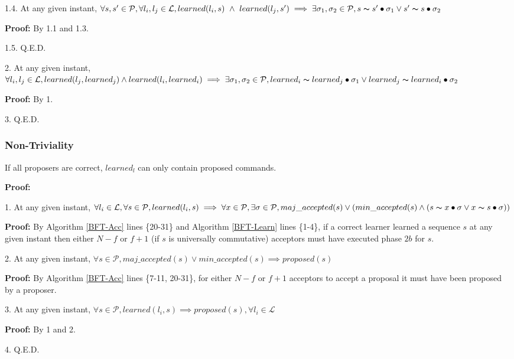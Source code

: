 \indent\indent\indent\parbox{\linewidth-\algorithmicindent*3}{\strut1.4. At any given instant, $\forall s,s' \in \mathcal{P}, \forall l_i,l_j \in \mathcal{L}, learned(l_i,s)\ \land\ learned(l_j,s') \implies \exists \sigma_1,\sigma_2 \in \mathcal{P}, s \thicksim s' \bullet \sigma_1 \lor s' \thicksim s \bullet \sigma_2$ }\par
\indent\indent\indent\indent\parbox{\linewidth}{\strut\textbf{Proof:} By 1.1 and 1.3.}\par
\indent\indent\indent\parbox{\linewidth}{\strut1.5. Q.E.D. }\par
\parbox{\linewidth-\algorithmicindent*3}{\strut2. At any given instant, $\forall l_i,l_j \in \mathcal{L}, learned(l_j,learned_j) \land learned(l_i,learned_i) \implies \exists \sigma_1,\sigma_2 \in \mathcal{P}, learned_i \thicksim learned_j \bullet \sigma_1 \lor learned_j \thicksim learned_i \bullet \sigma_2$}\par
\indent\indent\parbox{\linewidth}{\strut\textbf{Proof:} By 1.}\par
\parbox{\linewidth}{\strut3. Q.E.D.} \par

\subsubsection{Non-Triviality}
\begin{theorem}
If all proposers are correct, $learned_l$ can only contain proposed commands. \label{N-T1} \par
\end{theorem} 
\textbf{Proof:} \par
\parbox{\linewidth}{\strut1. At any given instant, $\forall l_i \in \mathcal{L}, \forall s \in \mathcal{P}, learned(l_i,s) \implies \forall x \in \mathcal{P}, \exists \sigma \in \mathcal{P},  maj\_accepted(s) \lor (min\_accepted(s) \land  (s \thicksim x \bullet \sigma \lor x \thicksim s \bullet \sigma))$ }\par
\indent\indent\parbox{\linewidth}{\strut\textbf{Proof:} By Algorithm \ref{BFT-Acc} lines \{20-31\} and Algorithm \ref{BFT-Learn} lines \{1-4\}, if a correct learner learned a sequence $s$ at any given instant then either $N-f$ or $f+1$ (if $s$ is universally commutative) acceptors must have executed phase $2b$ for $s$.}\par
\parbox{\linewidth}{\strut2. At any given instant, $\forall s \in \mathcal{P}, maj\_accepted(s) \lor min\_accepted(s) \implies proposed(s)$ }\par
\indent\indent\parbox{\linewidth}{\strut\textbf{Proof:} By Algorithm \ref{BFT-Acc} lines \{7-11, 20-31\}, for either $N-f$ or $f+1$ acceptors to accept a proposal it must have been proposed by a proposer.}\par
\parbox{\linewidth}{\strut3. At any given instant, $\forall s \in \mathcal{P}, learned(l_i,s) \implies proposed(s),\forall l_i \in \mathcal{L}$}\par
\indent\indent\parbox{\linewidth}{\strut\textbf{Proof:} By 1 and 2.}\par
\parbox{\linewidth}{\strut4. Q.E.D.}\par


